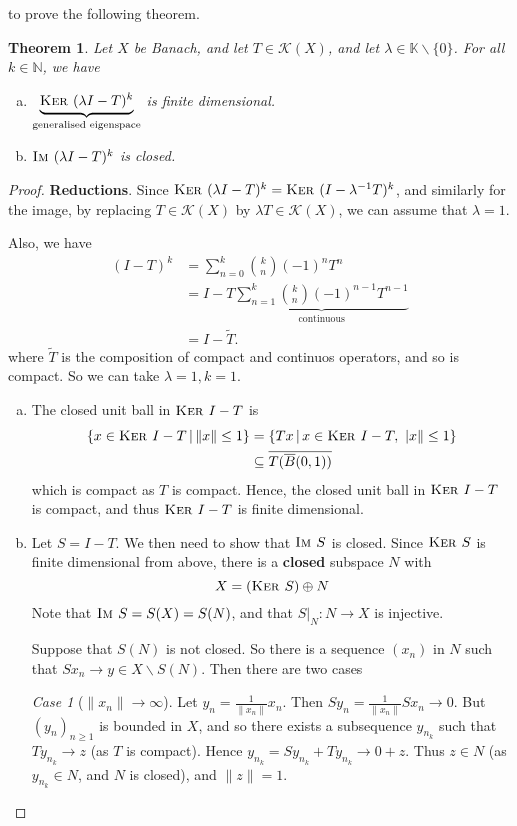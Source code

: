 \documentclass[justified]{tufte-book}
\theoremstyle{plain}%
\newtheorem{thm}{Theorem}[chapter]
\theoremstyle{definition}
\theoremstyle{remark}
\newtheorem{case}{Case}
\newcommand{\given}{ \, | \,}
\newcommand{\K}{\mathbb{K}}
\newcommand{\N}{\mathbb{N}}
\newcommand{\im}{\textsc{Im\ }}
\renewcommand{\ker}{\textsc{Ker\ }}
\begin{document}
 to prove the following theorem.

\begin{thm}
  Let $X$ be Banach, and let $T \in \mathcal K(X)$, and let $\lambda \in \K \backslash \{ 0 \}$.  For all $k \in \N$, we have \begin{enumerate}[(a)]
      \item $\underbrace{\ker(\lambda I - T)^k}_{\text{generalised eigenspace}}$ is finite dimensional.
      \item $\im(\lambda I - T)^k$ is closed.   
  \end{enumerate}
\end{thm}
\begin{proof}
  \textbf{Reductions}.  Since $\ker(\lambda I - T)^k = \ker(I - \lambda^{-1}T)^k$, and similarly for the image, by replacing $T \in \mathcal K(X)$ by $\lambda T \in \mathcal K(X)$, we can assume that $\lambda = 1$.
  
  Also, we have \begin{align*}
      (I - T)^k   &= \sum_{n=0}^k {k \choose n} (-1)^n T^n \\
                  &= I - T \underbrace{\sum_{n = 1}^k {k \choose n} (-1)^{n-1} T^{n-1}}_\text{continuous}  \\
                  &= I - \tilde T.
  \end{align*} where $\tilde T$ is the composition of compact and continuos operators, and so is compact.  So we can take $\lambda = 1, k = 1$.  
  
  \begin{enumerate}[(a)]
      \item The closed unit ball in $\ker I - T$ is \begin{align*}
      \{ x \in \ker I - T \given \| x \| \leq 1 \} &= \{ Tx \given x \in \ker I - T, \ | x \| \leq 1 \} \\
      &\subseteq \overline{T (\overline B(0, 1))}
      \end{align*} which is compact as $T$ is compact.  Hence, the closed unit ball in $\ker I - T$ is compact, and thus $\ker I - T$ is finite dimensional.
      \item Let $S = I - T$.  We then need to show that $\im S$ is closed.  Since $\ker S$ is finite dimensional from above, there is a \textbf{closed} subspace $N$ with \[
          X = (\ker S) \oplus N
      \]  Note that $\im S = S(X) = S(N)$, and that $S |_N : N \rightarrow X$ is injective. 
      
      Suppose that $S(N)$ is not closed.  So there is a sequence $(x_n)$ in $N$ such that $Sx_n \rightarrow y \in X \backslash S(N)$. Then there are two cases
      \begin{case}[$\| x_n \| \rightarrow \infty$]  Let $y_n = \frac{1}{\| x_n \|} x_n$.  Then $Sy_n = \frac{1}{\| x_n \|} S x_n \rightarrow 0$.  But $(y_n)_{ n \geq 1}$ is bounded in $X$, and so there exists a subsequence $y_{n_k}$ such that $T y_{n_k} \rightarrow z$ (as $T$ is compact).  Hence $y_{n_k} = S y_{n_k} + T y_{n_k} \rightarrow 0 + z$.  Thus $z \in N$ (as $y_{n_k} \in N$, and $N$ is closed), and $\| z \| = 1$.  
          

\end{case}
\end{enumerate}
\end{proof}
\end{document}
